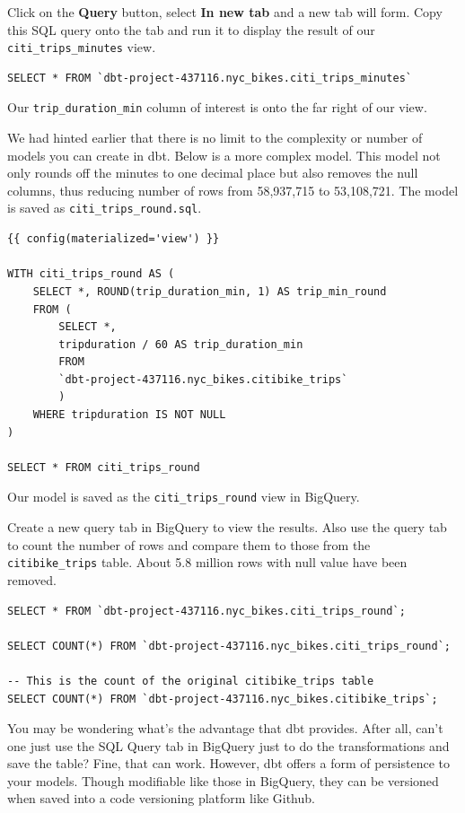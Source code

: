 \documentclass[
]{book}
\begin{document}
Click on the \textbf{Query} button, select \textbf{In new tab} and a new tab will form. Copy this SQL query onto the tab and run it to display the result of our \texttt{citi\_trips\_minutes} view.

\begin{verbatim}
SELECT * FROM `dbt-project-437116.nyc_bikes.citi_trips_minutes` 
\end{verbatim}

Our \texttt{trip\_duration\_min} column of interest is onto the far right of our view.

We had hinted earlier that there is no limit to the complexity or number of models you can create in dbt. Below is a more complex model. This model not only rounds off the minutes to one decimal place but also removes the null columns, thus reducing number of rows from 58,937,715 to 53,108,721. The model is saved as \texttt{citi\_trips\_round.sql}.

\begin{verbatim}
{{ config(materialized='view') }}

WITH citi_trips_round AS (
    SELECT *, ROUND(trip_duration_min, 1) AS trip_min_round
    FROM (
        SELECT *, 
        tripduration / 60 AS trip_duration_min
        FROM 
        `dbt-project-437116.nyc_bikes.citibike_trips`
        ) 
    WHERE tripduration IS NOT NULL
)

SELECT * FROM citi_trips_round
\end{verbatim}

Our model is saved as the \texttt{citi\_trips\_round} view in BigQuery.

Create a new query tab in BigQuery to view the results. Also use the query tab to count the number of rows and compare them to those from the \texttt{citibike\_trips} table. About 5.8 million rows with null value have been removed.

\begin{verbatim}
SELECT * FROM `dbt-project-437116.nyc_bikes.citi_trips_round`; 

SELECT COUNT(*) FROM `dbt-project-437116.nyc_bikes.citi_trips_round`;

-- This is the count of the original citibike_trips table
SELECT COUNT(*) FROM `dbt-project-437116.nyc_bikes.citibike_trips`;
\end{verbatim}

You may be wondering what's the advantage that dbt provides. After all, can't one just use the SQL Query tab in BigQuery just to do the transformations and save the table? Fine, that can work. However, dbt offers a form of persistence to your models. Though modifiable like those in BigQuery, they can be versioned when saved into a code versioning platform like Github.
\end{document}
